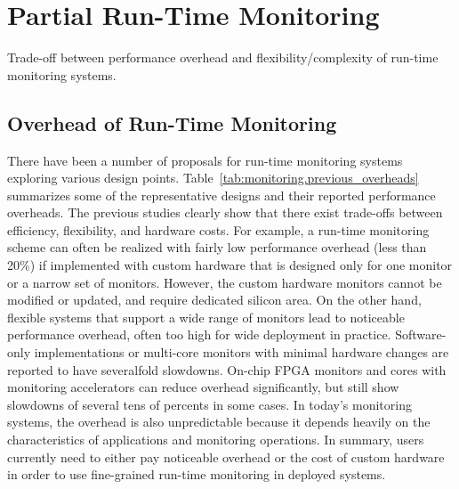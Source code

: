 \section{Partial Run-Time Monitoring}
\label{sec:monitoring}

\begin{table*}[t]
  \begin{center}
    \vspace{-0.0in}
    \begin{footnotesize}
    
    \end{footnotesize}
    \caption{Trade-off between performance overhead and flexibility/complexity of run-time monitoring systems.}
    \vspace{-0.2in}
    \label{tab:monitoring.previous_overheads}
  \end{center}
\end{table*}

\subsection{Overhead of Run-Time Monitoring}

There have been a number of proposals for run-time monitoring systems exploring various
design points. %
Table~\ref{tab:monitoring.previous_overheads} summarizes some of the representative designs
and their reported performance overheads. The previous studies clearly show that there
exist trade-offs between efficiency, flexibility, and hardware costs. 
For example, a run-time monitoring scheme can often be realized with fairly low
performance overhead (less than 20\%) if implemented with custom hardware that is
designed only for one monitor or a narrow set of monitors. However, the custom
hardware monitors cannot be modified or updated, and require dedicated silicon area. 
On the other hand, flexible systems that support a wide range of monitors lead 
to noticeable performance overhead, often too high for wide deployment in practice.
Software-only implementations \cite{nagarajan-interact08, lift-micro06,
purify-usenix92, taintcheck-ndsss05} or multi-core monitors with minimal
hardware changes \cite{lba-asid06} are reported to have severalfold slowdowns.
On-chip FPGA monitors \cite{flexcore-micro10} and cores with monitoring accelerators
\cite{lba-isca08, fade-hpca14} can reduce overhead significantly, but still show
slowdowns of several tens of percents in some cases.
In today's monitoring systems, the overhead is also unpredictable because it
depends heavily on the characteristics of applications and monitoring operations.
In summary, users currently need to either pay noticeable overhead or the cost of custom
hardware in order to use fine-grained run-time monitoring in deployed systems.

